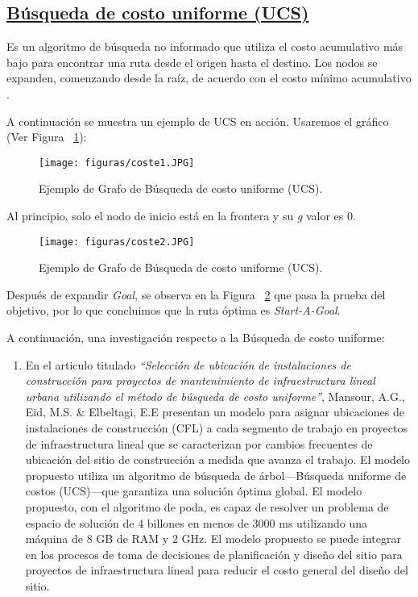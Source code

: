 \documentclass[10pt,conference]{IEEEtran}
\begin{document}
\subsection{\underline{\textbf{Búsqueda de costo uniforme (UCS)}}}
Es un algoritmo de búsqueda no informado que utiliza el costo acumulativo más bajo para encontrar una ruta desde el origen hasta el destino. Los nodos se expanden, comenzando desde la raíz, de acuerdo con el costo mínimo acumulativo \citep{coste}. 

A continuación se muestra un ejemplo de UCS en acción. Usaremos el gráfico (Ver Figura ~\ref{fcoste1}):

\begin{figure}[H]
 \begin{center}
       \texttt{[image: figuras/coste1.JPG]}
      \caption{Ejemplo de Grafo de Búsqueda de costo uniforme (UCS).}
      \label{fcoste1} 
      \end{center}
\end{figure}

Al principio, solo el nodo de inicio está en la frontera y su \textit{g} valor es 0.

\begin{figure}[H]
 \begin{center}
       \texttt{[image: figuras/coste2.JPG]}
      \caption{Ejemplo de Grafo de Búsqueda de costo uniforme (UCS).}
      \label{fcoste2} 
      \end{center}
\end{figure}

Después de expandir \textit{Goal}, se observa en la Figura ~\ref{fcoste2}  que pasa la prueba del objetivo, por lo que concluimos que la ruta óptima es \textit{Start{-}A{-}Goal}.

A continuación, una investigación respecto a la Búsqueda de costo uniforme:

\begin{enumerate}
\item En el articulo titulado \textit{“Selección de ubicación de instalaciones de construcción para proyectos de mantenimiento de infraestructura lineal urbana utilizando el método de búsqueda de costo uniforme”}, Mansour, A.G., Eid, M.S. \& Elbeltagi, E.E \citep{mansour} presentan un modelo para asignar ubicaciones de instalaciones de construcción (CFL) a cada segmento de trabajo en proyectos de infraestructura lineal que se caracterizan por cambios frecuentes de ubicación del sitio de construcción a medida que avanza el trabajo. El modelo propuesto utiliza un algoritmo de búsqueda de árbol—Búsqueda uniforme de costos (UCS)—que garantiza una solución óptima global. El modelo propuesto, con el algoritmo de poda, es capaz de resolver un problema de espacio de solución de 4 billones en menos de 3000 ms utilizando una máquina de 8 GB de RAM y 2 GHz. El modelo propuesto se puede integrar en los procesos de toma de decisiones de planificación y diseño del sitio para proyectos de infraestructura lineal para reducir el costo general del diseño del sitio.
\end{enumerate}
\end{document}
